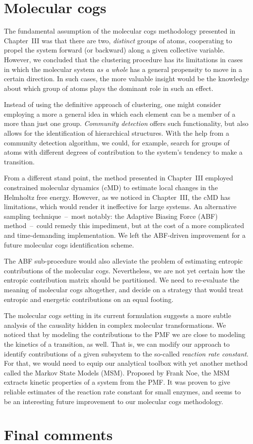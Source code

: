 \section{Molecular cogs}

The fundamental assumption of the molecular cogs methodology presented in Chapter~III was that there are two, \emph{distinct} groups of atoms, cooperating to propel the system forward (or backward) along a given collective variable.
However, we concluded that the clustering procedure has its limitations in cases in which the molecular system \emph{as a whole} has a general propensity to move in a certain direction.
In such cases, the more valuable insight would be the knowledge about which group of atoms plays the dominant role in such an effect.

Instead of using the definitive approach of clustering, one might consider employing a more a general idea in which each element can be a member of a more than just one group.
\emph{Community detection} offers such functionality, but also allows for the identification of hierarchical structures.
With the help from a community detection algorithm, we could, for example, search for groups of atoms with different degrees of contribution to the system's tendency to make a transition.

From a different stand point, the method presented in Chapter~III employed constrained molecular dynamics (cMD) to estimate local changes in the Helmholtz free energy.
However, as we noticed in Chapter~III, the cMD has limitations, which would render it ineffective for large systems.
An alternative sampling technique~--~most notably: the Adaptive Biasing Force (ABF) method~--~could remedy this impediment, but at the cost of a more complicated and time-demanding implementation.
We left the ABF-driven improvement for a future molecular cogs identification scheme.

The ABF sub-procedure would also alleviate the problem of estimating entropic contributions of the molecular cogs.
Nevertheless, we are not yet certain how the entropic contribution matrix should be partitioned.
We need to re-evaluate the meaning of molecular cogs altogether, and decide on a strategy that would treat entropic and energetic contributions on an equal footing.

The molecular cogs setting in its current formulation suggests a more subtle analysis of the causality hidden in complex molecular transformations.
We noticed that by modeling the contributions to the PMF we are close to modeling the kinetics of a transition, as well.
That is, we can modify our approach to identify contributions of a given subsystem to the so-called \emph{reaction rate constant}.
For that, we would need to equip our analytical toolbox with yet another method called the Markov State Models (MSM).
Proposed by Frank Noe, the MSM extracts kinetic properties of a system from the PMF.
It was proven to give reliable estimates of the reaction rate constant for small enzymes, and seems to be an interesting future improvement to our molecular cogs methodology.

\section{Final comments}